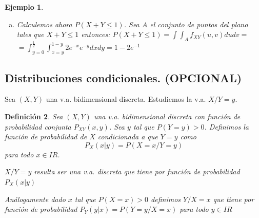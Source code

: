 \documentclass[12pt]{report}
\newtheorem{definition}{Definici\'on}
\newtheorem{example}[definition]{Ejemplo}
\def\R{I\!\!R}
\begin{document}
\begin{example}
\begin{enumerate}[a)]
                  si $x\geq 0$ y cero en cualquier otro caso.

                  De forma análoga:$f_{Y}(y)=2 e^{-2y}$ si $0\leq y$, siendo cero en cualquier
                  otro caso.

                  \item Calculemos ahora $P(X+Y\leq 1)$.
                  Sea $A$ el conjunto de puntos del plano tales que $X+Y\leq 1$
                  entonces:\newline
                  $\displaystyle P(X+Y\leq 1)=
                  \int\int_{A} f_{XY}(u,v) dudv=$\newline
                  $\displaystyle =\int_{y=0}^{\frac{1}{2}} \int_{x=y}^{1-y} 2 e^{-x}
                  e^{-y} dx dy=
                  1-2 e^{-1}$
                  
                  \end{enumerate}
\end{example}

 

  

\subsection{Distribuciones condicionales. (OPCIONAL)}


    Sea $(X,Y)$ una v.a. bidimensional discreta. Estudiemos la v.a.
    $X/Y=y$.

    \begin{definition}    Sea $(X,Y)$ una v.a. bidimensional discreta con función de
    probabilidad conjunta $P_{XY}(x,y)$. Sea $y$ tal que $P(Y=y)>0$.
    De\-fi\-ni\-mos la función de probabilidad de $X$ condicionada a que $Y=y$
    como $$P_{X}(x|y)=P(X=x/ Y=y)$$ para todo $x\in\R$.

    $X/Y=y$ resulta ser una v.a. discreta que tiene por función de probabilidad
    $P_{X}(x|y)$

    Análogamente dado $x$ tal que $P(X=x)>0$ definimos
      $Y/X=x$ que tiene por función de probabilidad $P_{Y}(y|x)=P(Y=y/
      X=x)$ para todo $y\in\R$

      \end{definition}
\end{document}
